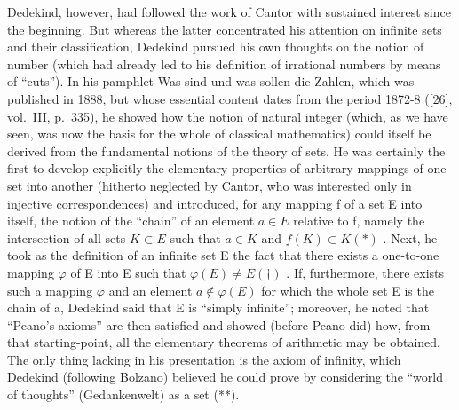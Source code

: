 Dedekind, however, had followed the work of Cantor with sustained interest since the beginning. But whereas the latter concentrated his attention on infinite sets and their classification, Dedekind pursued his own thoughts on the notion of number (which had already led to his definition of irrational numbers by means of ``cuts''). In his pamphlet Was sind und was sollen die Zahlen, which was published in 1888, but whose essential content dates from the period 1872-8 ({[}26{]}, vol.~III, p.~335), he showed how the notion of natural integer (which, as we have seen, was now the basis for the whole of classical mathematics) could itself be derived from the fundamental notions of the theory of sets. He was certainly the first to develop explicitly the elementary properties of arbitrary mappings of one set into another (hitherto neglected by Cantor, who was interested only in injective correspondences) and introduced, for any mapping f of a set E into itself, the notion of the ``chain'' of an element \(a \in E\) relative to f, namely the intersection of all sets \(K \subset E\) such that \(a \in K\) and \(f(K) \subset K (*)\) . Next, he took as the definition of an infinite set E the fact that there exists a one-to-one mapping \(\varphi\) of E into E such that \(\varphi(E) \neq E (\dagger)\) . If, furthermore, there exists such a mapping \(\varphi\) and an element \(a \notin \varphi(E)\) for which the whole set E is the chain of a, Dedekind said that E is ``simply infinite''; moreover, he noted that ``Peano's axioms'' are then satisfied and showed (before Peano did) how, from that starting-point, all the elementary theorems of arithmetic may be obtained. The only thing lacking in his presentation is the axiom of infinity, which Dedekind (following Bolzano) believed he could prove by considering the ``world of thoughts'' (Gedankenwelt) as a set (**).

